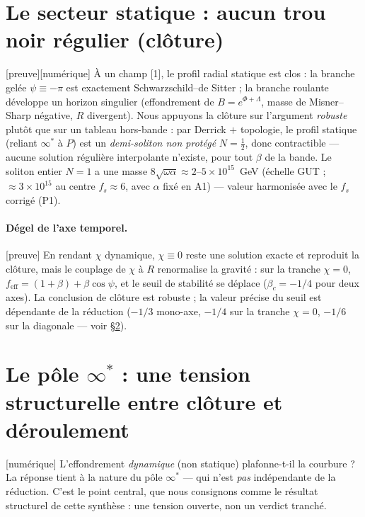 \documentclass[11pt,a4paper]{article}
\newcommand{\statut}[1]{{\footnotesize\textsf{[#1]}}}
\theoremstyle{definition}
\begin{document}
\section{Le secteur statique : aucun trou noir r\'egulier (cl\^oture)}\label{sec:static}
\statut{preuve}\statut{num\'erique} \`A un champ [1], le profil radial statique est clos : la
branche gel\'ee $\psi\equiv-\pi$ est exactement Schwarzschild--de Sitter ; la branche roulante
d\'eveloppe un horizon singulier (effondrement de $B=e^{\Phi+\Lambda}$, masse de Misner--Sharp
n\'egative, $R$ divergent). Nous appuyons la cl\^oture sur l'argument \emph{robuste} plut\^ot
que sur un tableau hors-bande : par Derrick $+$ topologie, le profil statique (reliant
$\infty^*$ \`a $P$) est un \emph{demi-soliton non prot\'eg\'e} $N=\tfrac12$, donc contractible
--- aucune solution r\'eguli\`ere interpolante n'existe, pour tout $\beta$ de la bande. Le
soliton entier $N=1$ a une masse $8\sqrt{\omega\alpha}\approx2$--$5\times10^{15}$~GeV (\'echelle
GUT ; $\approx3\times10^{15}$ au centre $f_s\approx6$, avec $\alpha$ fix\'e en A1) --- valeur
harmonis\'ee avec le $f_s$ corrig\'e (P1).

\paragraph{D\'egel de l'axe temporel.} \statut{preuve} En rendant $\chi$ dynamique,
$\chi\equiv0$ reste une solution exacte et reproduit la cl\^oture, mais le couplage de $\chi$
\`a $R$ renormalise la gravit\'e : sur la tranche $\chi=0$,
$f_{\mathrm{eff}}=(1+\beta)+\beta\cos\psi$, et le seuil de stabilit\'e se d\'eplace
($\beta_c=-1/4$ pour deux axes). La conclusion de cl\^oture est robuste ; la valeur pr\'ecise du
seuil est d\'ependante de la r\'eduction ($-1/3$ mono-axe, $-1/4$ sur la tranche $\chi=0$, $-1/6$
sur la diagonale --- voir \S\ref{sec:pole}).

\section{Le p\^ole $\infty^*$ : une tension structurelle entre cl\^oture et d\'eroulement}\label{sec:pole}
\statut{num\'erique} L'effondrement \emph{dynamique} (non statique) plafonne-t-il la courbure ?
La r\'eponse tient \`a la nature du p\^ole $\infty^*$ --- qui n'est \emph{pas} ind\'ependante de
la r\'eduction. C'est le point central, que nous consignons comme le r\'esultat structurel de
cette synth\`ese : une tension ouverte, non un verdict tranch\'e.
\end{document}
